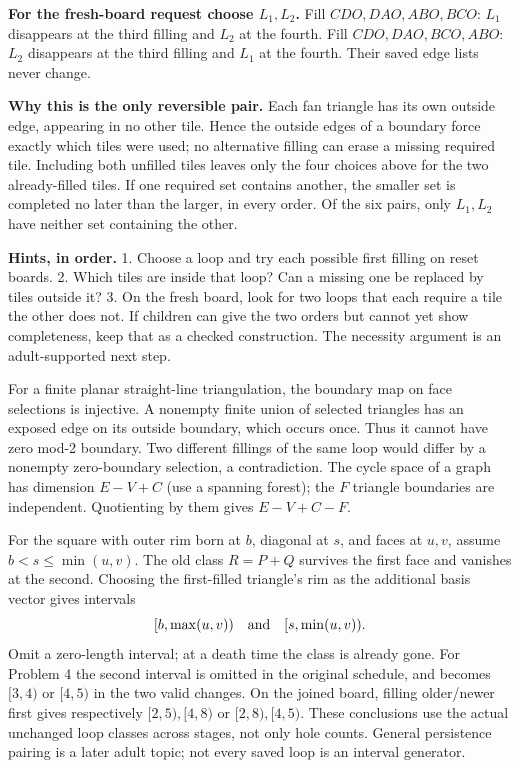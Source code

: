 \documentclass[10pt,letterpaper]{article}
\newcommand{\sectiontitle}[1]{\par\vspace{5pt}{\bfseries\fontsize{12}{14}\selectfont #1}\par}
\newcommand{\hint}[1]{\par\textbf{Hints, in order.} #1}
\begin{document}
\textbf{For the fresh-board request choose \(L_1,L_2\).}
Fill \(CDO,DAO,ABO,BCO\): \(L_1\) disappears at the third filling and \(L_2\) at the fourth.
Fill \(CDO,DAO,BCO,ABO\): \(L_2\) disappears at the third filling and \(L_1\) at the fourth. Their saved edge lists never change.

\textbf{Why this is the only reversible pair.} Each fan triangle has its own outside edge, appearing in no other tile. Hence the outside edges of a boundary force exactly which tiles were used; no alternative filling can erase a missing required tile. Including both unfilled tiles leaves only the four choices above for the two already-filled tiles. If one required set contains another, the smaller set is completed no later than the larger, in every order. Of the six pairs, only \(L_1,L_2\) have neither set containing the other.
\hint{1. Choose a loop and try each possible first filling on reset boards. 2. Which tiles are inside that loop? Can a missing one be replaced by tiles outside it? 3. On the fresh board, look for two loops that each require a tile the other does not.}
If children can give the two orders but cannot yet show completeness, keep that as a checked construction. The necessity argument is an adult-supported next step.

\sectiontitle{Adult mathematics: short proofs and next steps}
For a finite planar straight-line triangulation, the boundary map on face selections is injective. A nonempty finite union of selected triangles has an exposed edge on its outside boundary, which occurs once. Thus it cannot have zero mod-2 boundary. Two different fillings of the same loop would differ by a nonempty zero-boundary selection, a contradiction. The cycle space of a graph has dimension \(E-V+C\) (use a spanning forest); the \(F\) triangle boundaries are independent. Quotienting by them gives \(E-V+C-F\).

For the square with outer rim born at \(b\), diagonal at \(s\), and faces at \(u,v\), assume \(b<s\leq\min(u,v)\). The old class \(R=P+Q\) survives the first face and vanishes at the second. Choosing the first-filled triangle's rim as the additional basis vector gives intervals
\[
[b,\max(u,v))\quad\hbox{and}\quad[s,\min(u,v)).
\]
Omit a zero-length interval; at a death time the class is already gone. For Problem 4 the second interval is omitted in the original schedule, and becomes \([3,4)\) or \([4,5)\) in the two valid changes. On the joined board, filling older/newer first gives respectively \([2,5),[4,8)\) or \([2,8),[4,5)\). These conclusions use the actual unchanged loop classes across stages, not only hole counts. General persistence pairing is a later adult topic; not every saved loop is an interval generator.
\end{document}
